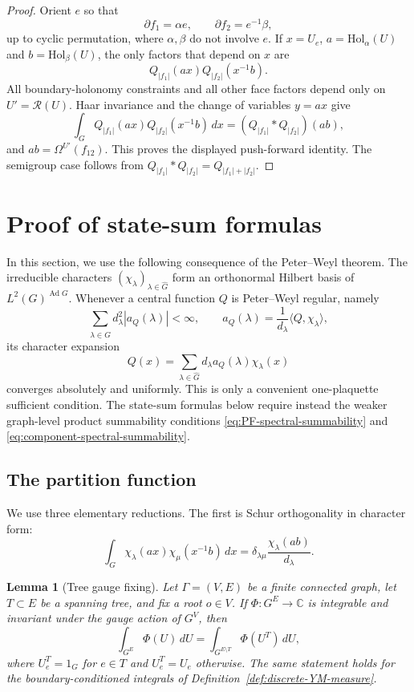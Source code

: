 \documentclass[11pt,a4paper,reqno]{article}
\newtheorem{lemma}[theorem]{Lemma}
\theoremstyle{definition}
\theoremstyle{remark}
\newcommand\Hol{{\mathrm{Hol}}}
\begin{document}
\begin{proof}
Orient $e$ so that
\[
 \partial f_1=\alpha e,
 \qquad
 \partial f_2=e^{-1}\beta,
\]
up to cyclic permutation, where $\alpha,\beta$ do not involve $e$. If
$x=U_e$, $a=\Hol_\alpha(U)$ and $b=\Hol_\beta(U)$, the only factors that
depend on $x$ are
\[
 Q_{|f_1|}(ax)Q_{|f_2|}(x^{-1}b).
\]
All boundary-holonomy constraints and all other face factors depend only on
$U'=\mathcal R(U)$. Haar invariance and the change of variables $y=ax$
give
\[
 \int_GQ_{|f_1|}(ax)Q_{|f_2|}(x^{-1}b)\,dx
 =
 (Q_{|f_1|}*Q_{|f_2|})(ab),
\]
and $ab=\Omega^{U'}(f_{12})$. This proves the displayed push-forward
identity. The semigroup case follows from
$Q_{|f_1|}*Q_{|f_2|}=Q_{|f_1|+|f_2|}$.
\end{proof}



\section{Proof of state-sum formulas}

In this section, we use the following consequence of the Peter--Weyl
theorem. The irreducible characters $(\chi_\lambda)_{\lambda\in\widehat G}$
form an orthonormal Hilbert basis of
$L^2(G)^{\operatorname{Ad}G}$. Whenever a central function $Q$ is
Peter--Weyl regular, namely
\[
\sum_{\lambda\in\widehat G} d_\lambda^2 |a_Q(\lambda)|<\infty,
\qquad
a_Q(\lambda)=\frac1{d_\lambda}\langle Q,\chi_\lambda\rangle,
\]
its character expansion
\[
Q(x)=\sum_{\lambda\in\widehat G}d_\lambda a_Q(\lambda)\chi_\lambda(x)
\]
converges absolutely and uniformly. This is only a convenient
one-plaquette sufficient condition. The state-sum formulas below require
instead the weaker graph-level product summability conditions
\eqref{eq:PF-spectral-summability} and
\eqref{eq:component-spectral-summability}.

\subsection{The partition function}

We use three elementary reductions. The first is Schur orthogonality in
character form:
\begin{equation}\label{eq:character-face-gluing}
 \int_G\chi_\lambda(ax)\chi_\mu(x^{-1}b)\,dx
 =
 \delta_{\lambda\mu}\frac{\chi_\lambda(ab)}{d_\lambda}.
\end{equation}

\begin{lemma}[Tree gauge fixing]\label{lem:tree-gauge-fixing}
Let $\Gamma=(V,E)$ be a finite connected graph, let $T\subset E$ be a
spanning tree, and fix a root $o\in V$. If $\Phi:G^E\to\mathbb C$ is
integrable and invariant under the gauge action of $G^V$, then
\[
 \int_{G^E}\Phi(U)\,dU
 =
 \int_{G^{E\setminus T}}\Phi(U^T)\,dU,
\]
where $U^T_e=1_G$ for $e\in T$ and $U^T_e=U_e$ otherwise.
The same statement holds for the boundary-conditioned integrals of
Definition~\ref{def:discrete-YM-measure}.
\end{lemma}
\end{document}
